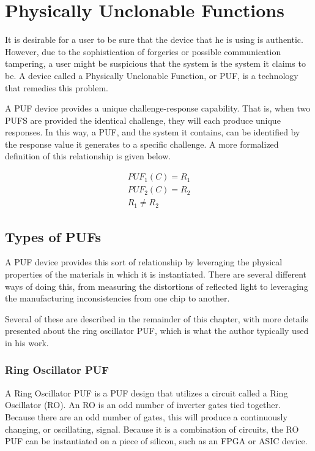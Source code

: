 
\chapter{Physically Unclonable Functions}
\label{chapter:pufoverview}
It is desirable for a user to be sure that the device that he is using is authentic. However, due to the sophistication
of forgeries or possible communication tampering, a user might be suspicious that the system is the system it claims
to be. A device called a Physically Unclonable Function, or PUF, is a technology that remedies this problem.

A PUF device provides a unique challenge-response capability. That is, when two PUFS are provided the identical
challenge, they will each produce unique responses. In this way, a PUF, and the system it contains, 
can be identified by the response value it generates to a specific challenge. A more formalized definition of
this relationship is given below.

\begin{align*}
PUF_1(C) = R_1\\
PUF_2(C) = R_2\\
R_1 \neq R_2
\end{align*}

\section{Types of PUFs}
A PUF device provides this sort of relationship by leveraging the physical properties
of the materials in which it is instantiated. There are several different ways of doing
this, from measuring the distortions of reflected light to leveraging the
manufacturing inconsistencies from one chip to another.

Several of these are described in the remainder of this chapter, with more details
presented about the ring oscillator PUF, which is what the author typically used in
his work.

\subsection{Ring Oscillator PUF}
A Ring Oscillator PUF is a PUF design that utilizes a circuit called a Ring 
Oscillator (RO). An RO is an odd number of inverter gates tied together. Because
there are an odd number of gates, this will produce a continuously changing,
or oscillating, signal. Because it is a combination of circuits, the RO PUF can
be instantiated on a piece of silicon, such as an FPGA or ASIC device.


